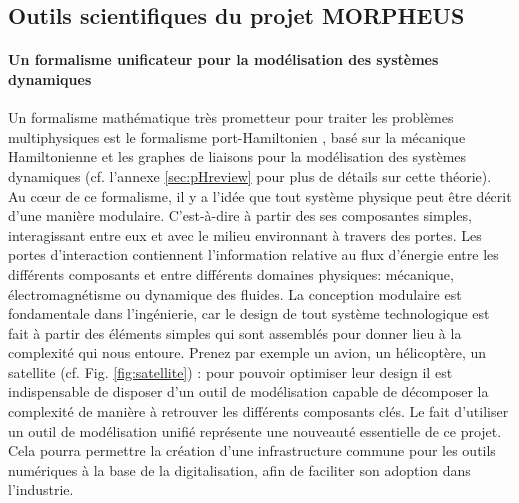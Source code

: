 \documentclass[12pt, french]{article}
\begin{document}
	
	\subsection{Outils scientifiques du projet MORPHEUS}
	
	
	\paragraph{\large Un formalisme unificateur pour la modélisation des systèmes dynamiques\\}
	Un formalisme mathématique très prometteur pour traiter les problèmes multiphysiques est le formalisme port-Hamiltonien \cite{vanderSchaft2002}, basé sur la mécanique Hamiltonienne et les graphes de liaisons pour la modélisation des systèmes dynamiques (cf. l'annexe \ref{sec:pHreview} pour plus de détails sur cette théorie). Au c\oe{}ur de ce formalisme, il y a l'idée que tout système physique peut être décrit d'une manière modulaire. C'est-à-dire à partir des ses composantes simples, interagissant entre eux et avec le milieu environnant à travers des portes. Les portes d'interaction contiennent l'information relative au flux d'énergie entre les différents composants et entre différents domaines physiques: mécanique, électromagnétisme ou dynamique des fluides. La conception modulaire est fondamentale dans l'ingénierie, car le design de tout système technologique est fait à partir des éléments simples qui sont assemblés pour donner lieu à la complexité qui nous entoure. Prenez par exemple un avion, un hélicoptère, un satellite (cf. Fig. \ref{fig:satellite}) : pour pouvoir optimiser leur design il est indispensable de disposer d'un outil de modélisation capable de décomposer la complexité de manière à retrouver les différents composants clés. Le fait d'utiliser un outil de modélisation unifié représente une nouveauté essentielle de ce projet. Cela pourra permettre la création d'une infrastructure commune pour les outils numériques à la base de la digitalisation, afin de faciliter son adoption dans l'industrie.
	
\end{document}
